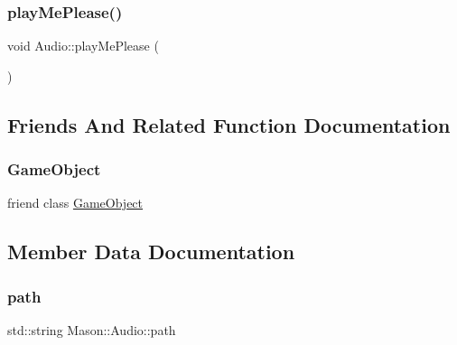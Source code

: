 \hypertarget{class_mason_1_1_audio_ac7d8df0800550af53c8f6f5e1299e4b3}{}\label{class_mason_1_1_audio_ac7d8df0800550af53c8f6f5e1299e4b3} 
\subsubsection{\texorpdfstring{play\+Me\+Please()}{playMePlease()}}
{\footnotesize\ttfamily void Audio\+::play\+Me\+Please (\begin{DoxyParamCaption}{ }\end{DoxyParamCaption})}



\subsection{Friends And Related Function Documentation}
\hypertarget{class_mason_1_1_audio_a00df87c957d8f7ee0fc51f07a0542f4a}{}\label{class_mason_1_1_audio_a00df87c957d8f7ee0fc51f07a0542f4a} 
\subsubsection{\texorpdfstring{Game\+Object}{GameObject}}
{\footnotesize\ttfamily friend class \hyperlink{class_mason_1_1_game_object}{Game\+Object}\hspace{0.3cm}{\ttfamily [friend]}}



\subsection{Member Data Documentation}
\hypertarget{class_mason_1_1_audio_a762cc6174ce20a011fe1e3a36e649204}{}\label{class_mason_1_1_audio_a762cc6174ce20a011fe1e3a36e649204} 
\subsubsection{\texorpdfstring{path}{path}}
{\footnotesize\ttfamily std\+::string Mason\+::\+Audio\+::path}

\hypertarget{class_mason_1_1_audio_a100d9da58685f865bf03dcf44a55fb63}{}\label{class_mason_1_1_audio_a100d9da58685f865bf03dcf44a55fb63} 
